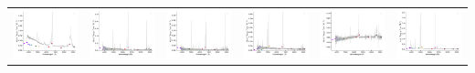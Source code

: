 \begin{center}
\begin{longtable}{l l l l l l }
    \includegraphics[width=0.3\linewidth, clip]{Figs/Figs-sdss/spec-0518-52282-0022-SPLUS-n02n26-033149.pdf} & \includegraphics[width=0.3\linewidth, clip]{Figs/Figs-sdss/spec-0686-52519-0104-STRIPE82-0005-024320.pdf} & \includegraphics[width=0.3\linewidth, clip]{Figs/Figs-sdss/spec-0705-52200-0577-STRIPE82-0056-038958.pdf} & \includegraphics[width=0.3\linewidth, clip]{Figs/Figs-sdss/spec-1023-52818-0521-STRIPE82-0106-057954.pdf} & \includegraphics[width=0.3\linewidth, clip]{Figs/Figs-sdss/spec-1086-52525-0146-STRIPE82-0013-036763.pdf} & \includegraphics[width=0.3\linewidth, clip]{Figs/Figs-sdss/spec-1114-53179-0599-STRIPE82-0110-008449.pdf} \\

\end{longtable}
\end{center}
